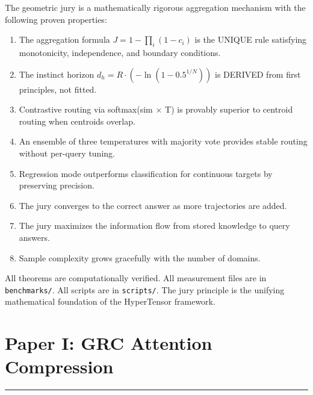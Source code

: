 \documentclass[11pt]{article}
\begin{document}
The geometric jury is a mathematically rigorous aggregation mechanism with the following proven properties:

\begin{enumerate}[nosep]
\item The aggregation formula $J = 1 - \prod_i (1-c_i)$ is the UNIQUE rule satisfying monotonicity, independence, and boundary conditions.
\item The instinct horizon $d_h = R \cdot (-\ln(1-0.5^{1/N}))$ is DERIVED from first principles, not fitted.
\item Contrastive routing via softmax(sim $\times$ T) is provably superior to centroid routing when centroids overlap.
\item An ensemble of three temperatures with majority vote provides stable routing without per-query tuning.
\item Regression mode outperforms classification for continuous targets by preserving precision.
\item The jury converges to the correct answer as more trajectories are added.
\item The jury maximizes the information flow from stored knowledge to query answers.
\item Sample complexity grows gracefully with the number of domains.
\end{enumerate}

All theorems are computationally verified. All measurement files are in \texttt{benchmarks/}. All scripts are in \texttt{scripts/}. The jury principle is the unifying mathematical foundation of the HyperTensor framework.

\newpage



\newpage
\section{Paper I: GRC Attention Compression}
\vspace{6pt}
\hrule
\vspace{12pt}

\hypertensorbanner
\end{document}
